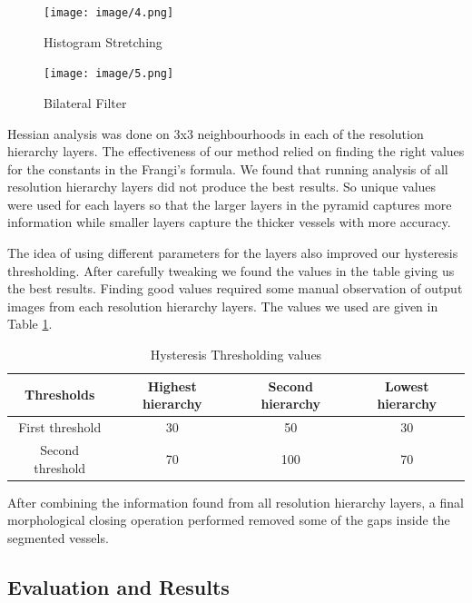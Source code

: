 \documentclass[conference]{IEEEtran}
\begin{document}
\begin{figure}[H]
	\centering
	\texttt{[image: image/4.png]}
	\caption{Histogram Stretching}
	\label{fig:4}
\end{figure}

\begin{figure}[H]
	\centering
	\texttt{[image: image/5.png]}
	\caption{Bilateral Filter}
	\label{fig:5}
\end{figure}


Hessian analysis was done on 3x3 neighbourhoods in each of the resolution hierarchy layers. The effectiveness of our method relied on finding the right values for the constants in the Frangi’s formula. We found that running analysis of all resolution hierarchy layers did not produce the best results. So unique values were used for each layers so that the larger layers in the pyramid captures more information while smaller layers capture the thicker vessels with more accuracy.
\par
The idea of using different parameters for the layers also improved our hysteresis thresholding. After carefully tweaking we found the values in the table giving us the best results. Finding good values required some manual observation of output images from each resolution hierarchy layers. The values we used are given in Table \ref{table:2}.

\begin{table}[t]
\centering
 \begin{tabular}{|c| c c c|} 
 \hline
 Thresholds & Highest hierarchy & Second hierarchy & Lowest hierarchy\\ [0.5ex] 
 \hline
 First threshold & 30 & 50 & 30 \\ 
 \hline
 Second threshold & 70 & 100 & 70\\
 \hline
\end{tabular}
\vspace*{0.25cm}
\caption{Hysteresis Thresholding values}
\label{table:2}
\end{table}

\par

After combining the information found from all resolution hierarchy layers, a final morphological closing operation performed removed some of the gaps inside the segmented vessels.

\subsection{Evaluation and Results}
\label{ssec:gresults}
\par
\end{document}
